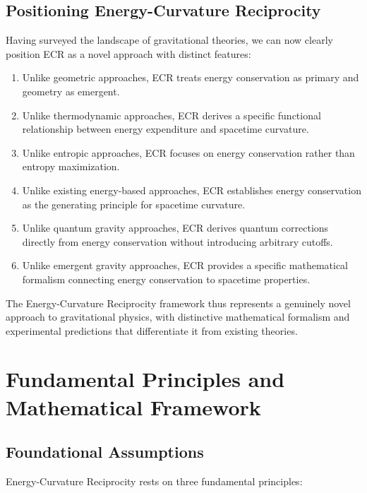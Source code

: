 \documentclass[11pt,a4paper]{article}
\begin{document}
\subsection{Positioning Energy-Curvature Reciprocity}

Having surveyed the landscape of gravitational theories, we can now clearly position ECR as a novel approach with distinct features:

\begin{enumerate}
    \item Unlike geometric approaches, ECR treats energy conservation as primary and geometry as emergent.
    
    \item Unlike thermodynamic approaches, ECR derives a specific functional relationship between energy expenditure and spacetime curvature.
    
    \item Unlike entropic approaches, ECR focuses on energy conservation rather than entropy maximization.
    
    \item Unlike existing energy-based approaches, ECR establishes energy conservation as the generating principle for spacetime curvature.
    
    \item Unlike quantum gravity approaches, ECR derives quantum corrections directly from energy conservation without introducing arbitrary cutoffs.
    
    \item Unlike emergent gravity approaches, ECR provides a specific mathematical formalism connecting energy conservation to spacetime properties.
\end{enumerate}

The Energy-Curvature Reciprocity framework thus represents a genuinely novel approach to gravitational physics, with distinctive mathematical formalism and experimental predictions that differentiate it from existing theories.

\section{Fundamental Principles and Mathematical Framework}\label{sec:principles}

\subsection{Foundational Assumptions}
Energy-Curvature Reciprocity rests on three fundamental principles:
\end{document}
